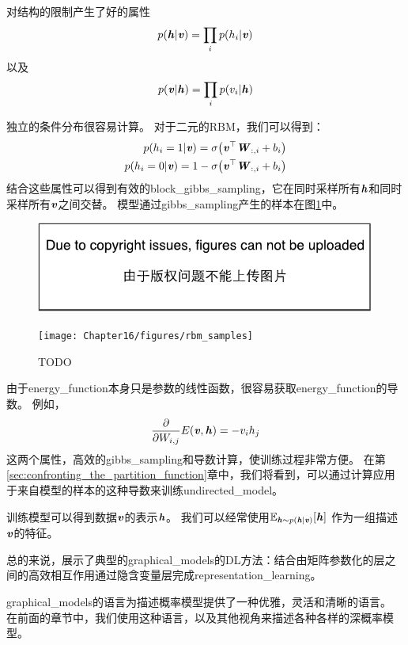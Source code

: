 对结构的限制产生了好的属性
\begin{align}
\label{eqn:1611}
p(\boldsymbol{\mathit{h}}\vert\boldsymbol{\mathit{v}}) = \prod_i p(h_i\vert \boldsymbol{\mathit{v}})
\end{align}
以及
\begin{align}
\label{eqn:1612}
p(\boldsymbol{\mathit{v}}\vert\boldsymbol{\mathit{h}}) = \prod_i p(v_i\vert \boldsymbol{\mathit{h}})
\end{align}


独立的条件分布很容易计算。
对于二元的\gls{RBM}，我们可以得到：
\begin{align}
\label{eqn:1613}
\begin{aligned}
p(h_i = 1\vert\boldsymbol{\mathit{v}}) = \sigma\big(\boldsymbol{\mathit{v}}^{\top}\boldsymbol{\mathit{W}}_{:,i} + b_i\big)\\
p(h_i = 0\vert\boldsymbol{\mathit{v}}) = 1 - \sigma\big(\boldsymbol{\mathit{v}}^{\top}\boldsymbol{\mathit{W}}_{:,i} + b_i\big)\\
\end{aligned}
\end{align}
结合这些属性可以得到有效的\gls{block_gibbs_sampling}，它在同时采样所有$\boldsymbol{\mathit{h}}$和同时采样所有$\boldsymbol{\mathit{v}}$之间交替。
模型通过\gls{gibbs_sampling}产生的样本在图\ref{fig:rbm_sample}中。

\begin{figure}[!htb]
\ifOpenSource
\centerline{\includegraphics{figure.pdf}}
\else
	\centerline{\texttt{[image: Chapter16/figures/rbm\_samples]}}	
\fi
	\caption{TODO}
	\label{fig:rbm_sample}
\end{figure}


由于\gls{energy_function}本身只是参数的线性函数，很容易获取\gls{energy_function}的导数。 例如，
\begin{align}
\label{eqn:1615}
\frac{\partial}{\partial W_{i,j}} E(\boldsymbol{\mathit{v}},\boldsymbol{\mathit{h}}) = - v_i h_j
\end{align}
这两个属性，高效的\gls{gibbs_sampling}和导数计算，使训练过程非常方便。
在第\ref{sec:confronting_the_partition_function}章中，我们将看到，可以通过计算应用于来自模型的样本的这种导数来训练\gls{undirected_model}。

训练模型可以得到数据$\boldsymbol{\mathit{v}}$的表示$\boldsymbol{\mathit{h}}$。
我们可以经常使用$\mathbb{E}_{\boldsymbol{\mathit{h}}\sim p(\boldsymbol{\mathit{h}}\vert\boldsymbol{\mathit{v}})}[\boldsymbol{\mathit{h}}]$ 作为一组描述$\boldsymbol{\mathit{v}}$的特征。



总的来说，展示了典型的\gls{graphical_models}的\gls{DL}方法：结合由矩阵参数化的层之间的高效相互作用通过隐含变量层完成\gls{representation_learning}。


\gls{graphical_models}的语言为描述概率模型提供了一种优雅，灵活和清晰的语言。 在前面的章节中，我们使用这种语言，以及其他视角来描述各种各样的深概率模型。




